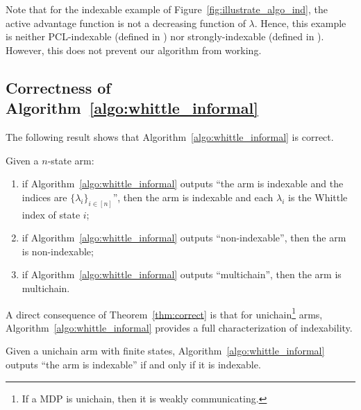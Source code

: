 \noindent Note that for the indexable example of Figure~\ref{fig:illustrate_algo_ind}, the active advantage function is not a decreasing function of $\lambda$. Hence, this example is neither PCL-indexable (defined in \cite[Definition~3]{nino2020fast}) nor strongly-indexable (defined in \cite{nakhleh2021neurwin}). However, this does not prevent our algorithm from working. 

\subsection{Correctness of Algorithm~\ref{algo:whittle_informal}}

The following result shows that Algorithm~\ref{algo:whittle_informal} is correct.

\begin{thm}
    \label{thm:correct}
    Given a $n$-state arm:
    \begin{enumerate}[label=(\roman*)]
        \item \label{it:idx_proof} if Algorithm~\ref{algo:whittle_informal} outputs ``the arm is indexable and the indices are $\{\lambda_i\}_{i\in[n]}$'', then the arm is indexable and each $\lambda_i$ is the Whittle index of state $i$;
        \item \label{it:non_idx_proof} if Algorithm~\ref{algo:whittle_informal} outputs ``non-indexable'', then the arm is non-indexable;
        \item \label{it:multi_chain} if Algorithm~\ref{algo:whittle_informal} outputs ``multichain'', then the arm is multichain.
    \end{enumerate}
\end{thm}
A direct consequence of Theorem~\ref{thm:correct} is that for unichain\footnote{If a MDP is unichain, then it is weakly communicating.} arms, Algorithm~\ref{algo:whittle_informal} provides a full characterization of indexability. 
\begin{cor}
    \label{coro:correct_unichain}
    Given a unichain arm with finite states, Algorithm~\ref{algo:whittle_informal} outputs ``the arm is indexable'' if and only if it is indexable. 
\end{cor}

